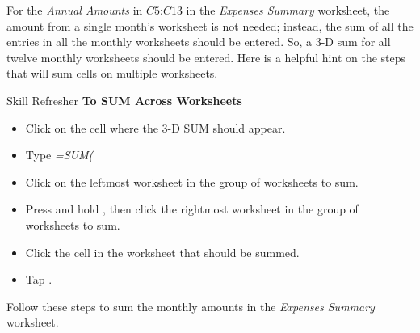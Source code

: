 For the \textit{Annual Amounts} in $ C5 $:$ C13 $ in the \textit{Expenses Summary} worksheet, the amount from a single month's worksheet is not needed; instead, the sum of all the entries in all the monthly worksheets should be entered. So, a $ 3 $-D sum for all twelve monthly worksheets should be entered. Here is a helpful hint on the steps that will sum cells on multiple worksheets.

\begin{center}
	\begin{sklbox}{Skill Refresher}
		\textbf{To SUM Across Worksheets}
		\\
		\begin{itemize}
			\setlength{\itemsep}{0pt}
			\setlength{\parskip}{0pt}
			\setlength{\parsep}{0pt}
			
			\item Click on the cell where the $ 3 $-D SUM should appear.
			\item Type \textit{=SUM(}
			\item Click on the leftmost worksheet in the group of worksheets to sum.
			\item Press and hold , then click the rightmost worksheet in the group of worksheets to sum.
			\item Click the cell in the worksheet that should be summed.
			\item Tap .
			
		\end{itemize}
	\end{sklbox}
\end{center}

Follow these steps to sum the monthly amounts in the \textit{Expenses Summary} worksheet.

